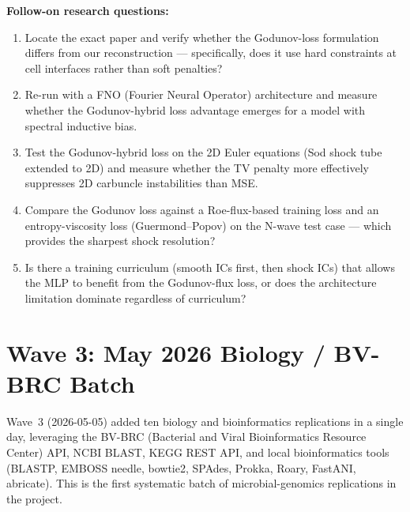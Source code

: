 \documentclass[11pt]{article}
\begin{document}
\noindent\textbf{Follow-on research questions:}
\begin{enumerate}[leftmargin=1.6em,itemsep=0.2em,topsep=0.2em,label=Q\arabic*.]
\item Locate the exact paper and verify whether the Godunov-loss formulation differs from our reconstruction --- specifically, does it use hard constraints at cell interfaces rather than soft penalties?
\item Re-run with a FNO (Fourier Neural Operator) architecture and measure whether the Godunov-hybrid loss advantage emerges for a model with spectral inductive bias.
\item Test the Godunov-hybrid loss on the 2D Euler equations (Sod shock tube extended to 2D) and measure whether the TV penalty more effectively suppresses 2D carbuncle instabilities than MSE.
\item Compare the Godunov loss against a Roe-flux-based training loss and an entropy-viscosity loss (Guermond--Popov) on the N-wave test case --- which provides the sharpest shock resolution?
\item Is there a training curriculum (smooth ICs first, then shock ICs) that allows the MLP to benefit from the Godunov-flux loss, or does the architecture limitation dominate regardless of curriculum?
\end{enumerate}


\clearpage
\section{Wave 3: May 2026 Biology / BV-BRC Batch}

Wave~3 (2026-05-05) added ten biology and bioinformatics replications in a
single day, leveraging the BV-BRC (Bacterial and Viral Bioinformatics
Resource Center) API, NCBI BLAST, KEGG REST API, and local bioinformatics
tools (BLASTP, EMBOSS needle, bowtie2, SPAdes, Prokka, Roary, FastANI,
abricate). This is the first systematic batch of microbial-genomics
replications in the project.
\end{document}
